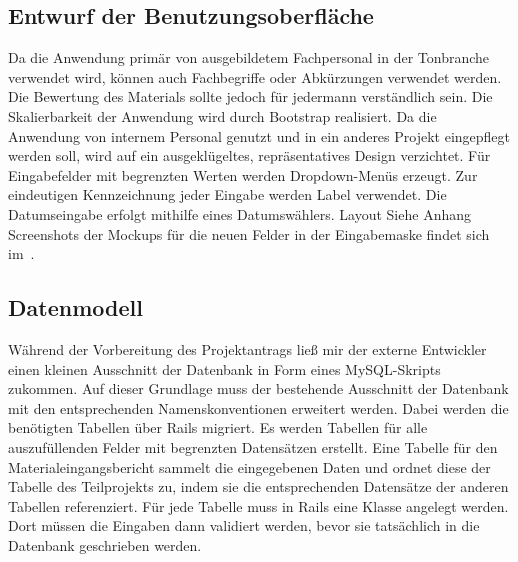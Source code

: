 \subsection{Entwurf der Benutzungsoberfläche}
\label{sec:Benutzungsoberfläche}
Da die Anwendung primär von ausgebildetem Fachpersonal in der Tonbranche verwendet wird, können auch Fachbegriffe oder Abkürzungen verwendet werden. Die Bewertung des Materials sollte jedoch für jedermann verständlich sein. Die Skalierbarkeit der Anwendung wird durch Bootstrap realisiert. Da die Anwendung von internem Personal genutzt und in ein anderes Projekt eingepflegt werden soll, wird auf ein ausgeklügeltes, repräsentatives Design verzichtet. Für Eingabefelder mit begrenzten Werten werden Dropdown-Menüs erzeugt. Zur eindeutigen Kennzeichnung jeder Eingabe werden Label verwendet. Die Datumseingabe erfolgt mithilfe eines Datumswählers. Layout Siehe Anhang Screenshots der Mockups für die neuen Felder in der Eingabemaske findet sich im~.

\subsection{Datenmodell}
\label{sec:Datenmodell}
Während der Vorbereitung des Projektantrags ließ mir der externe Entwickler einen kleinen Ausschnitt der Datenbank in Form eines MySQL-Skripts zukommen. Auf dieser Grundlage muss der bestehende Ausschnitt der Datenbank mit den entsprechenden Namenskonventionen erweitert werden. Dabei werden die benötigten Tabellen über Rails migriert. Es werden Tabellen für alle auszufüllenden Felder mit begrenzten Datensätzen erstellt. Eine Tabelle für den Materialeingangsbericht sammelt die eingegebenen Daten und ordnet diese der Tabelle des Teilprojekts zu, indem sie die entsprechenden Datensätze der anderen Tabellen referenziert. Für jede Tabelle muss in Rails eine Klasse angelegt werden. Dort müssen die Eingaben dann validiert werden, bevor sie tatsächlich in die Datenbank geschrieben werden.

